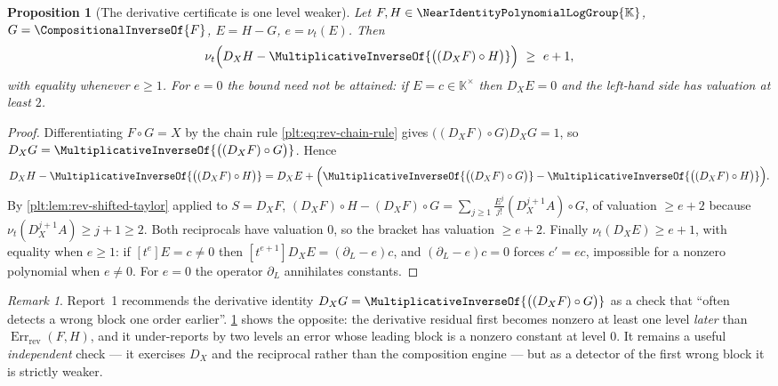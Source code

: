 \documentclass[11pt,oneside]{article}
\theoremstyle{plain}
\newtheorem{proposition}[theorem]{Proposition}
\theoremstyle{definition}
\theoremstyle{remark}
\newtheorem{remark}[theorem]{Remark}
\newcommand{\K}{\mathbb{K}}
\newcommand{\Gnear}{\NearIdentityPolynomialLogGroup{\K}} %
\newcommand{\ordt}{\nu_{t}}                              %
\newcommand{\DX}{D_{X}}                                  %
\newcommand{\compose}{\mathbin{\circ}}
\newcommand{\rev}[1]{\CompositionalInverseOf{#1}}
\newcommand{\RevErr}[2]{\operatorname{Err}_{\mathrm{rev}}\!\left(#1,#2\right)}
\begin{document}
\begin{proposition}[The derivative certificate is one level weaker]
\label{plt:prop:rev-derivative-certificate}
Let \(F,H\in\Gnear\), \(G=\rev{F}\), \(E=H-G\), \(e=\ordt(E)\).  Then
\begin{equation}\label{plt:eq:rev-derivative-certificate}
 \ordt\Bigl(\DX H-\MultiplicativeInverseOf{\bigl((\DX F)\compose H\bigr)}\Bigr)
 \ \ge\ e+1,
\end{equation}
with equality whenever \(e\ge1\).  For \(e=0\) the bound need not be attained:
if \(E=c\in\K^\times\) then \(\DX E=0\) and the left-hand side has valuation at
least \(2\).
\end{proposition}

\begin{proof}
Differentiating \(F\compose G=X\) by the chain rule
\eqref{plt:eq:rev-chain-rule} gives
\(\bigl((\DX F)\compose G\bigr)\DX G=1\), so
\(\DX G=\MultiplicativeInverseOf{\bigl((\DX F)\compose G\bigr)}\).  Hence
\[
 \DX H-\MultiplicativeInverseOf{\bigl((\DX F)\compose H\bigr)}
 =\DX E
 +\Bigl(\MultiplicativeInverseOf{\bigl((\DX F)\compose G\bigr)}
       -\MultiplicativeInverseOf{\bigl((\DX F)\compose H\bigr)}\Bigr).
\]
By \cref{plt:lem:rev-shifted-taylor} applied to \(S=\DX F\),
\((\DX F)\compose H-(\DX F)\compose G
=\sum_{j\ge1}\frac{E^j}{j!}(\DX^{j+1}A)\compose G\), of valuation
\(\ge e+2\) because \(\ordt(\DX^{j+1}A)\ge j+1\ge2\).  Both reciprocals have
valuation \(0\), so the bracket has valuation \(\ge e+2\).  Finally
\(\ordt(\DX E)\ge e+1\), with equality when \(e\ge1\): if
\([t^{e}]E=c\ne0\) then \([t^{e+1}]\DX E=(\partial_L-e)c\), and
\((\partial_L-e)c=0\) forces \(c'=ec\), impossible for a nonzero polynomial
when \(e\ne0\).  For \(e=0\) the operator \(\partial_L\) annihilates constants.
\end{proof}

\begin{remark}
\label{plt:rmk:rev-derivative-certificate}
Report~1 recommends the derivative identity
\(\DX G=\MultiplicativeInverseOf{\bigl((\DX F)\compose G\bigr)}\) as a check
that ``often detects a wrong block one order earlier''.
\cref{plt:prop:rev-derivative-certificate} shows the opposite: the derivative
residual first becomes nonzero at least one level \emph{later} than
\(\RevErr{F}{H}\), and it under-reports by two levels an error whose leading
block is a nonzero constant at level \(0\).  It remains a useful
\emph{independent} check --- it exercises \(\DX\) and the reciprocal rather
than the composition engine --- but as a detector of the first wrong block it
is strictly weaker.
\end{remark}
\end{document}
